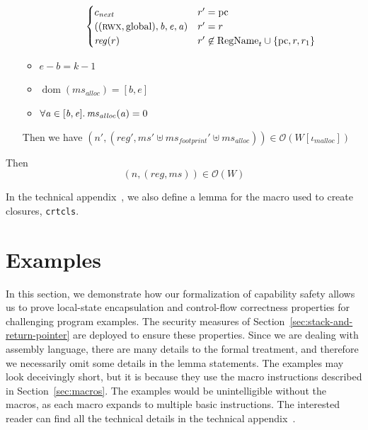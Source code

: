 \documentclass[format=acmsmall, review=true, screen=true]{acmart}
\renewcommand{\sectionname}{Section}
\newcommand{\union}{\mathbin{\cup}}
\DeclareMathOperator{\dom}{dom}
\newcommand{\var}[1]{\mathit{#1}}
\newcommand{\hs}{\var{ms}}
\newcommand{\ms}{\hs}
\newcommand{\pcreg}{\mathrm{pc}}
\newcommand{\addr}{\var{a}}
\newcommand{\start}{\var{b}}
\newcommand{\addrend}{\var{e}}
\newcommand{\reg}{\var{reg}}
\newcommand{\codelabel}[1]{\mathit{#1}}
\newcommand{\malloc}{\codelabel{malloc}}
\newcommand{\plaindom}[1]{\mathrm{#1}}
\newcommand{\RegName}{\plaindom{RegName}}
\newcommand{\observations}{\mathcal{O}}
\newcommand{\npair}[2][n]{\left(#1,#2 \right)}
\newcommand{\plainperm}[1]{\textsc{#1}}
\newcommand{\rwx}{\plainperm{rwx}}
\newcommand{\plainlocality}[1]{\mathrm{#1}}
\newcommand{\glob}{\plainlocality{global}}
\newenvironment{toplas}{}{}
\newcommand{\itoplassug}[1]{}
\begin{document}
\begin{toplas}
\begin{lemma}
\begin{enumerate}
\begin{itemize}
\begin{equation*}
\begin{cases}
          c_{\var{next}} & r' = \pcreg \\
          ((\rwx,\glob),\start,\addrend,\addr) & r' = r \\
          \reg(r) & r' \not\in \RegName_t \union \{\pcreg, r, r_1\}
        \end{cases}
      \end{equation*}
    \item $\addrend - \start = k - 1$
    \item $\dom(\ms_{\var{alloc}}) = [\start,\addrend]$
    \item $\forall \addr \in [\start,\addrend]\ldotp \ms_{\var{alloc}}(\addr) = 0$
    \end{itemize}
    Then we have $\npair[n']{(\reg',\ms' \uplus \ms_{\var{footprint}}'  \uplus \ms_{\var{alloc}})} \in \observations(W[\iota_\malloc])$
  \end{enumerate}
  Then
  \[
    \npair{(\reg,\ms)} \in \observations(W)
  \]
\end{lemma}
In the technical appendix~\citep{technical_appendix}, we also define a lemma for
the macro used to create closures, \texttt{crtcls}.
\end{toplas}

\section{Examples}
\label{sec:examples}
\itoplassug{Suggestion: add a couple of short proof sketches.}
In this section, we demonstrate how our formalization of capability safety
allows us to prove local-state encapsulation and control-flow correctness
properties for challenging program examples. The security measures
of \sectionname~\ref{sec:stack-and-return-pointer} are deployed to ensure these
properties. Since we are dealing with assembly language, there are many details
to the formal treatment, and therefore we necessarily omit some details in the
lemma statements. The examples may look deceivingly short, but it is because
they use the macro instructions described in \sectionname~\ref{sec:macros}.
The examples would be
unintelligible without the macros, as each macro expands to multiple basic instructions. The interested reader can find all the
technical details in the technical appendix~\citep{technical_appendix}.
\end{document}
